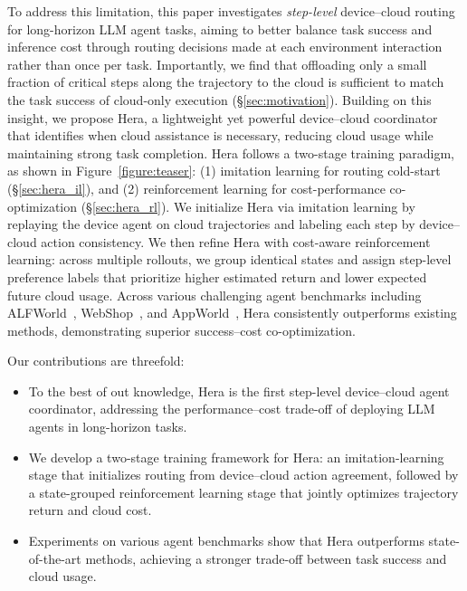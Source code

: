 \documentclass{article}
\newcommand{\name}{Hera\xspace}
\begin{document}
To address this limitation, this paper investigates \textit{step-level} device--cloud routing for long-horizon LLM agent tasks, aiming to better balance task success and inference cost through routing decisions made at each environment interaction rather than once per task. Importantly, we find that offloading only a small fraction of critical steps along the trajectory to the cloud is sufficient to match the task success of cloud-only execution (\S\ref{sec:motivation}).
Building on this insight, we propose \name, a lightweight yet powerful device--cloud coordinator that identifies when cloud assistance is necessary, reducing cloud usage while maintaining strong task completion.
\name follows a two-stage training paradigm, as shown in Figure~\ref{figure:teaser}: (1) imitation learning for routing cold-start (\S\ref{sec:hera_il}), and (2) reinforcement learning for cost-performance co-optimization (\S\ref{sec:hera_rl}).
We initialize \name via imitation learning by replaying the device agent on cloud trajectories and labeling each step by device--cloud action consistency.
We then refine \name with cost-aware reinforcement learning: across multiple rollouts, we group identical states and assign step-level preference labels that prioritize higher estimated return and lower expected future cloud usage.
Across various challenging agent benchmarks including ALFWorld~\citep{ALFWorld20}, WebShop~\citep{yao2022webshop}, and AppWorld~\citep{appworld}, \name consistently outperforms existing methods, demonstrating superior success--cost co-optimization.

Our contributions are threefold:
\begin{itemize}
    \item To the best of out knowledge, \name is the first step-level device--cloud agent coordinator, addressing the performance--cost trade-off of deploying LLM agents in long-horizon tasks.
    \item We develop a two-stage training framework for \name: an imitation-learning stage that initializes routing from device--cloud action agreement, followed by a state-grouped reinforcement learning stage that jointly optimizes trajectory return and cloud cost.
    \item Experiments on various agent benchmarks show that \name outperforms state-of-the-art methods, achieving a stronger trade-off between task success and cloud usage.
\end{itemize}
\end{document}
